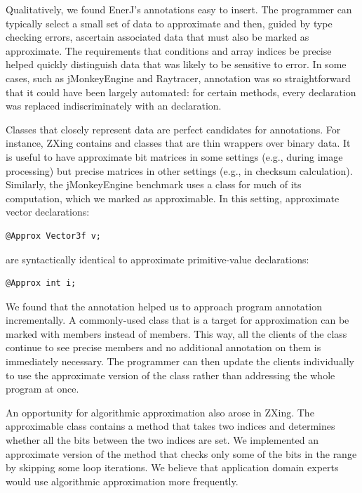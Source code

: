 Qualitatively, we found EnerJ's annotations easy to insert. The programmer
can typically select a small set of data to approximate and then, guided by type
checking errors, ascertain associated data that must also be marked as
approximate. The requirements that conditions and array indices be precise
helped quickly distinguish data that was likely to be sensitive to error. In
some cases, such as jMonkeyEngine and Raytracer, annotation was so
straightforward that it could have been largely automated: for certain methods,
every  declaration was replaced indiscriminately with an
 declaration.

Classes that closely represent data are perfect candidates for
 annotations. For instance, ZXing contains
 and  classes that are thin wrappers over
binary data. It is useful to have approximate bit matrices in some settings (e.g.,
during image processing) but precise matrices in other settings (e.g., in
checksum calculation). Similarly, the jMonkeyEngine benchmark uses a
 class for much of its computation, which we marked
as approximable.
In this setting, approximate vector declarations:
%
\begin{lstlisting}
@Approx Vector3f v;
\end{lstlisting}
%
are syntactically identical to
approximate primitive-value declarations:
%
\begin{lstlisting}
@Approx int i;
\end{lstlisting}

We found that the  annotation helped us to approach program
annotation incrementally. A commonly-used class that is a target for
approximation can be marked with  members instead of
 members. This way, all the clients of the class continue to
see precise members and no additional annotation on them is immediately
necessary. The programmer can then update the clients individually to use the
approximate version of the class rather than addressing the whole program at
once.

An opportunity for algorithmic approximation also arose in ZXing. The approximable class
 contains a method  that
takes two indices and determines whether all the bits between the
two indices are set. We implemented an approximate version of the method that
checks only some of the bits in the range by skipping some loop iterations.
We believe that application domain experts would use algorithmic
approximation more frequently.

